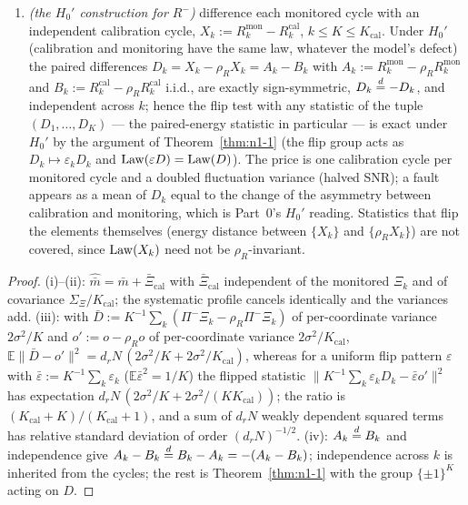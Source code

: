 \begin{lemma}
\begin{enumerate}
\item[(iv)] \emph{(the $H_0'$ construction for $R^{-}$)} difference each
monitored cycle with an independent calibration cycle,
$X_k := R^{\mathrm{mon}}_k - R^{\mathrm{cal}}_k$, $k \le K \le K_{\mathrm{cal}}$.
Under $H_0'$ (calibration and monitoring have the same law, whatever the
model's defect) the paired differences $D_k = X_k - \rho_R X_k = A_k - B_k$
with $A_k := R^{\mathrm{mon}}_k - \rho_R R^{\mathrm{mon}}_k$ and
$B_k := R^{\mathrm{cal}}_k - \rho_R R^{\mathrm{cal}}_k$ i.i.d., are exactly
sign-symmetric, $D_k \overset{d}{=} -D_k$, and independent across $k$; hence the
flip test with any statistic of the tuple $(D_1,\dots,D_K)$ --- the
paired-energy statistic in particular --- is exact under $H_0'$ by the argument of
Theorem~\ref{thm:n1-1} (the flip group acts as $D_k \mapsto \varepsilon_k D_k$
and $\operatorname{Law}(\varepsilon D) = \operatorname{Law}(D)$). The price is one calibration cycle per
monitored cycle and a doubled fluctuation variance (halved SNR); a fault
appears as a mean of $D_k$ equal to the change of the asymmetry between
calibration and monitoring, which is Part~0's $H_0'$ reading. Statistics that
flip the elements themselves (energy distance between $\{X_k\}$ and
$\{\rho_R X_k\}$) are not covered, since $\operatorname{Law}(X_k)$ need not be
$\rho_R$-invariant.
\end{enumerate}
\end{lemma}

\begin{proof}
(i)--(ii): $\hat{\bar m} = \bar m + \bar\Xi_{\mathrm{cal}}$ with
$\bar\Xi_{\mathrm{cal}}$ independent of the monitored $\Xi_k$ and of
covariance $\Sigma_\Xi/K_{\mathrm{cal}}$; the systematic profile cancels
identically and the variances add. (iii): with $\bar D := K^{-1}\sum_k
(\Pi^-\Xi_k - \rho_R\Pi^-\Xi_k)$ of per-coordinate variance $2\sigma^2/K$ and
$o' := o - \rho_R o$ of per-coordinate variance $2\sigma^2/K_{\mathrm{cal}}$,
$\mathbb{E}\|\bar D - o'\|^2 = d_r N\,(2\sigma^2/K + 2\sigma^2/K_{\mathrm{cal}})$,
whereas for a uniform flip pattern $\varepsilon$ with $\bar\varepsilon :=
K^{-1}\sum_k \varepsilon_k$ ($\mathbb{E}\bar\varepsilon^2 = 1/K$) the flipped
statistic $\|K^{-1}\sum_k \varepsilon_k D_k - \bar\varepsilon o'\|^2$ has
expectation $d_r N\,(2\sigma^2/K + 2\sigma^2/(K K_{\mathrm{cal}}))$; the
ratio is $(K_{\mathrm{cal}}+K)/(K_{\mathrm{cal}}+1)$, and a sum of $d_r N$
weakly dependent squared terms has relative standard deviation of order
$(d_r N)^{-1/2}$. (iv): $A_k \overset{d}{=} B_k$ and independence give
$A_k - B_k \overset{d}{=} B_k - A_k = -(A_k - B_k)$; independence across $k$ is
inherited from the cycles; the rest is Theorem~\ref{thm:n1-1} with the group
$\{\pm 1\}^K$ acting on $D$.
\end{proof}

